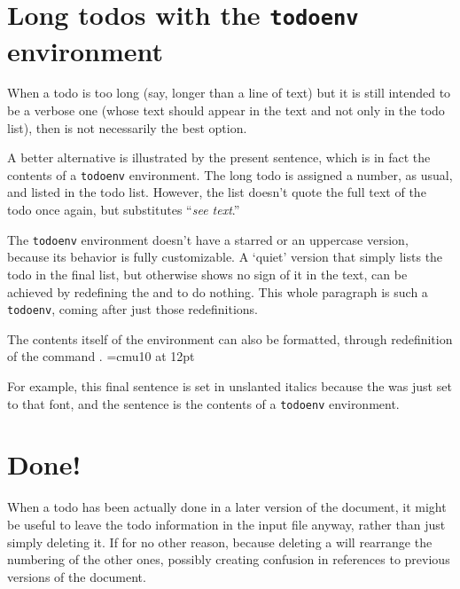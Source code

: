 \documentclass[12pt]{article}
\providecommand\cs[1]{\texttt{\string#1}}
\begin{document}
\section{Long todos with the \texttt{todoenv} environment}
When a todo is too long (say, longer than a line of text) but it is still intended to be a verbose one (whose text should appear in the text and not only in the todo list), then \cs{\Todo} is not necessarily the best option. \begin{todoenv}A better alternative is illustrated by the present sentence, which is in fact the contents of a \texttt{todoenv} environment. The long todo is assigned a number, as usual, and listed in the todo list. However, the list doesn't quote the full text of the todo once again, but substitutes ``\emph{see text}.''\end{todoenv}

\renewcommand\todoopen{}\renewcommand\todoclose{}
\begin{todoenv}
The \texttt{todoenv} environment doesn't have a starred or an uppercase version, because its behavior is fully customizable. A `quiet' version that simply lists the todo in the final list, but otherwise shows no sign of it in the text, can be achieved by redefining the \cs{\todoopen} and \cs{\todoclose} to do nothing. This whole paragraph is such a \texttt{todoenv}, coming after just those redefinitions.
\end{todoenv}

The contents itself of the environment can also be formatted, through redefinition of the command \cs{\todoenvformat}. \font\usli=cmu10 at 12pt\renewcommand\todoenvformat{\usli}\begin{todoenv}For example, this final sentence is set in unslanted italics because the \cs{\todoenvformat} was just set to that font, and the sentence is the contents of a \texttt{todoenv} environment.\end{todoenv}

\section{Done!}

When a todo has been actually done in a later version of the document, it might be useful to leave the todo information in the input file anyway, rather than just simply deleting it. If for no other reason, because deleting a \cs{\todo} will rearrange the numbering of the other ones, possibly creating confusion in references to previous versions of the document.
\end{document}
